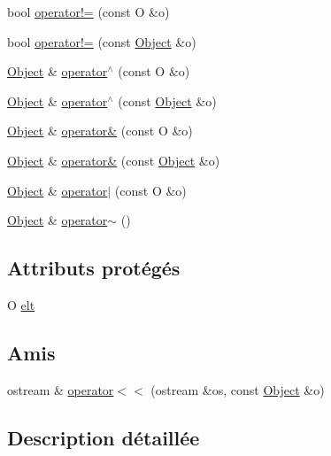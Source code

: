 \begin{DoxyCompactItemize}
\item 
bool \hyperlink{class_object_a74a09ebb7325affab7a36722447ba3be}{operator!=} (const O \&o)
\item 
bool \hyperlink{class_object_ad9c2e8211d7e3822f88b56ef74a453e6}{operator!=} (const \hyperlink{class_object}{Object} \&o)
\item 
\hyperlink{class_object}{Object} \& \hyperlink{class_object_a0b5ab29ee535166da73a9663e40a404e}{operator$^\wedge$} (const O \&o)
\item 
\hyperlink{class_object}{Object} \& \hyperlink{class_object_a5e700ab1a5b8d7f03ab44e841fb0efcb}{operator$^\wedge$} (const \hyperlink{class_object}{Object} \&o)
\item 
\hyperlink{class_object}{Object} \& \hyperlink{class_object_a70555fefbc0832da61fda166b40aa6a8}{operator\&} (const O \&o)
\item 
\hyperlink{class_object}{Object} \& \hyperlink{class_object_a40ff14af9a98f948767b6a4c41ef215e}{operator\&} (const \hyperlink{class_object}{Object} \&o)
\item 
\hyperlink{class_object}{Object} \& \hyperlink{class_object_a10746acda9c977db58ce84678e027203}{operator$|$} (const O \&o)
\item 
\hyperlink{class_object}{Object} \& \hyperlink{class_object_a37e2268c6564f146ccac90d1a1a108e3}{operator$\sim$} ()
\end{DoxyCompactItemize}
\subsection*{Attributs protégés}
\begin{DoxyCompactItemize}
\item 
O \hyperlink{class_object_ad6c327fe66540b59a513df29f755af4b}{elt}
\end{DoxyCompactItemize}
\subsection*{Amis}
\begin{DoxyCompactItemize}
\item 
ostream \& \hyperlink{class_object_ab508b58bf37e341435dc0825e8274cb0}{operator$<$$<$} (ostream \&os, const \hyperlink{class_object}{Object} \&o)
\end{DoxyCompactItemize}


\subsection{Description détaillée}
